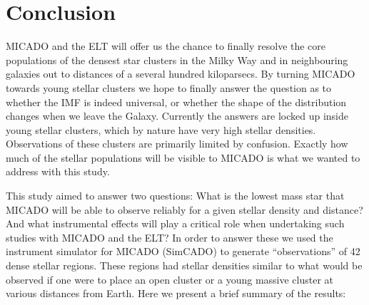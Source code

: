 \section{Conclusion}
\label{sec:conclusion}

MICADO and the ELT will offer us the chance to finally resolve the core populations of the densest star clusters in the Milky Way and in neighbouring galaxies out to distances of a several hundred kiloparsecs. By turning MICADO towards young stellar clusters we hope to finally answer the question as to whether the IMF is indeed universal, or whether the shape of the distribution changes when we leave the Galaxy. Currently the answers are locked up inside young stellar clusters, which by nature have very high stellar densities. Observations of these clusters are primarily limited by confusion. Exactly how much of the stellar populations will be visible to MICADO is what we wanted to address with this study.

This study aimed to answer two questions: What is the lowest mass star that MICADO will be able to observe reliably for a given stellar density and distance? And what instrumental effects will play a critical role when undertaking such studies with MICADO and the ELT? In order to answer these we used the instrument simulator for MICADO (SimCADO) to generate ``observations'' of 42 dense stellar regions. These regions had stellar densities similar to what would be observed if one were to place an open cluster or a young massive cluster at various distances from Earth. Here we present a brief summary of the results:

